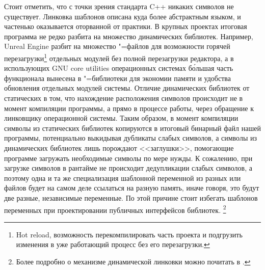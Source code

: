 Стоит отметить, что с точки зрения стандарта C++ никаких символов не существует.
Линковка шаблонов описана куда более абстрактным языком, и частенько оказывается оторванной от практики.
В крупных проектах итоговая программа не редко разбита на множество динамических библиотек.
Например, Unreal Engine разбит на множество "=файлов для возможности горячей перезагрузки\footnote{Hot reload, возможность перекомпилировать часть проекта и подгрузить изменения в уже работающий процесс без его перезагрузки.} отдельных модулей без полной перезагрузки редактора, а в использующих GNU core utilities операционных системах б\'{о}льшая часть функционала вынесена в "=библиотеки для экономии памяти и удобства обновления отдельных модулей системы.
Отличие динамических библиотек от статических в том, что нахождение расположения символов происходит не в момент компиляции программы, а прямо в процессе работы, через обращение к линковщику операционной системы.
Таким образом, в момент компиляции символы из статических библиотек копируются в итоговый бинарный файл нашей программы, потенциально выкидывая дубликаты слабых символов, а символы из динамических библиотек лишь порождают <<заглушки>>, помогающие программе загружать необходимые символы по мере нужды.
К сожалению, при загрузке символов в рантайме не происходит дедупликации слабых символов, а поэтому одна и та же специализация шаблонной переменной из разных  или  файлов будет на самом деле ссылаться на разную память, иначе говоря, это будут две разные, независимые переменные.
По этой причине стоит избегать шаблонов переменных при проектировании публичных интерфейсов библиотек.
\footnote{Более подробно о механизме динамической линковки можно почитать в \cite{DynamicLinking}.}


